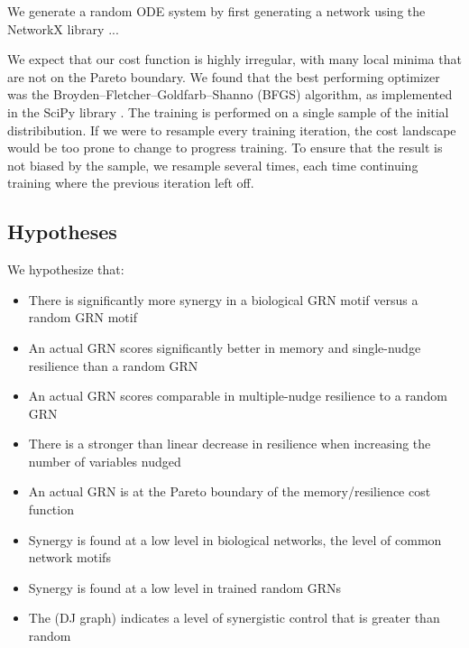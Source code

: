 \documentclass[../main.tex]{subfiles}
\begin{document}
We generate a random ODE system by first generating a network using the NetworkX library \cite{networkx}...

We expect that our cost function is highly irregular, with many local minima that are not on the Pareto boundary.
We found that the best performing optimizer was the Broyden–Fletcher–Goldfarb–Shanno (BFGS) algorithm, as implemented in the SciPy library \cite{fletcher2013practical, scipy}.
The training is performed on a single sample of the initial distribibution.
If we were to resample every training iteration, the cost landscape would be too prone to change to progress training.
To ensure that the result is not biased by the sample, we resample several times, each time continuing training where the previous iteration left off.

\subsection{Hypotheses}

We hypothesize that:

\begin{itemize}
\item There is significantly more synergy in a biological GRN motif versus a random GRN motif
\item An actual GRN scores significantly better in memory and single-nudge resilience than a random GRN
\item An actual GRN scores comparable in multiple-nudge resilience to a random GRN
\item There is a stronger than linear decrease in resilience when increasing the number of variables nudged
\item An actual GRN is at the Pareto boundary of the memory/resilience cost function
\item Synergy is found at a low level in biological networks, the level of common network motifs 
\item Synergy is found at a low level in trained random GRNs
\item The (DJ graph) indicates a level of synergistic control that is greater than random
\end{itemize}
\end{document}
